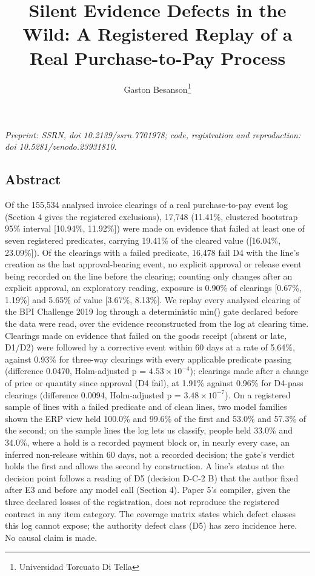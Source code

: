 \documentclass[
  10pt,
]{article}
\title{Silent Evidence Defects in the Wild: A Registered Replay of a
Real Purchase-to-Pay Process}
\author{Gaston Besanson\thanks{Universidad Torcuato Di Tella}}
\date{}
\begin{document}
\maketitle

\emph{Preprint: SSRN, doi 10.2139/ssrn.7701978; code, registration and
reproduction: doi 10.5281/zenodo.23931810.}

\hypertarget{abstract}{%
\subsection{Abstract}\label{abstract}}

Of the 155,534 analysed invoice clearings of a real purchase-to-pay
event log (Section 4 gives the registered exclusions), 17,748 (11.41\%,
clustered bootstrap 95\% interval {[}10.94\%, 11.92\%{]}) were made on
evidence that failed at least one of seven registered predicates,
carrying 19.41\% of the cleared value ({[}16.04\%, 23.09\%{]}). Of the
clearings with a failed predicate, 16,478 fail D4 with the line's
creation as the last approval-bearing event, no explicit approval or
release event being recorded on the line before the clearing; counting
only changes after an explicit approval, an exploratory reading,
exposure is 0.90\% of clearings {[}0.67\%, 1.19\%{]} and 5.65\% of value
{[}3.67\%, 8.13\%{]}. We replay every analysed clearing of the BPI
Challenge 2019 log through a deterministic min() gate declared before
the data were read, over the evidence reconstructed from the log at
clearing time. Clearings made on evidence that failed on the goods
receipt (absent or late, D1/D2) were followed by a corrective event
within 60 days at a rate of 5.64\%, against 0.93\% for three-way
clearings with every applicable predicate passing (difference 0.0470,
Holm-adjusted p = \(4.53 \times 10^{-4}\)); clearings made after a
change of price or quantity since approval (D4 fail), at 1.91\% against
0.96\% for D4-pass clearings (difference 0.0094, Holm-adjusted p =
\(3.48 \times 10^{-7}\)). On a registered sample of lines with a failed
predicate and of clean lines, two model families shown the ERP view held
100.0\% and 99.6\% of the first and 53.0\% and 57.3\% of the second; on
the sample lines the log lets us classify, people held 33.0\% and
34.0\%, where a hold is a recorded payment block or, in nearly every
case, an inferred non-release within 60 days, not a recorded decision;
the gate's verdict holds the first and allows the second by
construction. A line's status at the decision point follows a reading of
D5 (decision D-C-2 B) that the author fixed after E3 and before any
model call (Section 4). Paper 5's compiler, given the three declared
losses of the registration, does not reproduce the registered contract
in any item category. The coverage matrix states which defect classes
this log cannot expose; the authority defect class (D5) has zero
incidence here. No causal claim is made.
\end{document}
